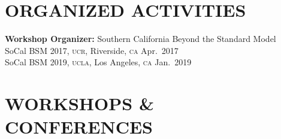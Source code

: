 \documentclass[margin,line]{resume}
\newcommand{\mytalksep}{-.1mm}
\newcommand{\scap}[1]{\textsc{\MakeLowercase{#1}}}
\begin{document}
\begin{resume}
\section{\footnotesize \sc
\sffamily 
{}ORGANIZED ACTIVITIES
}

\textbf{Workshop Organizer:} Southern California Beyond the Standard Model \vspace{\mytalksep}\\
%
SoCal BSM 2017, \scap{UCR}, Riverside, \scap{CA}
\hfill Apr.~2017\vspace{\mytalksep}
\\
%
SoCal BSM 2019, \scap{UCLA}, Los Angeles, \scap{CA}
\hfill Jan.~2019 









\section{\footnotesize \sc
\sffamily 
{}WORKSHOPS \&
CONFERENCES
}


\end{resume}
\end{document}
